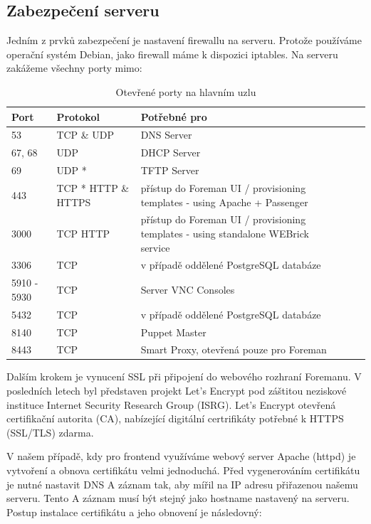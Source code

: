 \documentclass[thesis=B,czech]{FITthesis}[2012/06/26]
\begin{document}
\subsection{Zabezpečení serveru}

Jedním z prvků zabezpečení je nastavení firewallu na serveru. Protože používáme operační systém Debian, jako firewall máme k dispozici iptables. Na serveru zakážeme všechny porty mimo:

\begin{table}[h]
\centering
\caption{Otevřené porty na hlavním uzlu}
\label{my-label}
\begin{tabular}{@{}lllll@{}}
\toprule

Port &	Protokol &	Potřebné pro  \\ \midrule
53 &	TCP \& UDP &	DNS Server \\
67, 68 &	UDP &	DHCP  Server \\
69 &	UDP	*&  TFTP Server \\
 443 &	TCP	* HTTP \& HTTPS & přístup do Foreman UI / provisioning templates - using Apache + Passenger \\
3000 &	TCP	HTTP & přístup do Foreman UI / provisioning templates - using standalone WEBrick service \\
3306 &	TCP &	v případě oddělené PostgreSQL databáze \\
5910 - 5930 &	TCP &	Server VNC Consoles \\
5432 &	TCP &	v případě oddělené PostgreSQL databáze \\
8140 &	TCP &	Puppet Master \\
8443 &	TCP &	Smart Proxy, otevřená pouze pro Foreman \\ \bottomrule
\end{tabular}
\end{table}

Dalším krokem je vynucení SSL při připojení do webového rozhraní Foremanu. V posledních letech byl představen projekt Let's Encrypt pod záštitou neziskové instituce Internet Security Research Group (ISRG). Let's Encrypt otevřená certifikační autorita (CA), nabízející digitální certrifikáty potřebné k HTTPS (SSL/TLS) zdarma.

V našem případě, kdy pro frontend využíváme webový server Apache (httpd) je vytvoření a obnova certifikátu velmi jednoduchá. Před vygenerováním certifikátu je nutné nastavit DNS A záznam tak, aby mířil na IP adresu přiřazenou našemu serveru. Tento A záznam musí být stejný jako hostname nastavený na serveru.  Postup instalace certifikátu a jeho obnovení je následovný:
\end{document}
